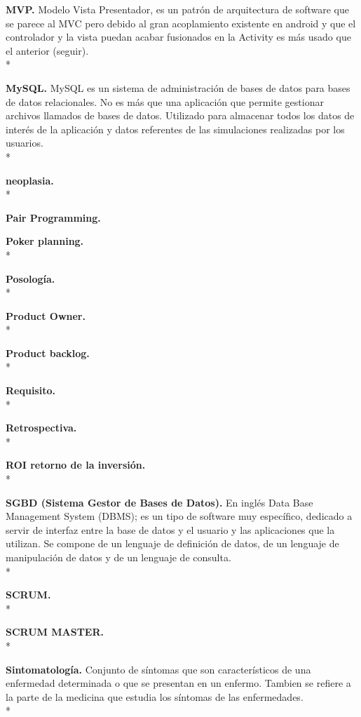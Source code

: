 \documentclass[../pfc.tex]{subfiles}
\begin{document}
	\textbf{MVP.}
	Modelo Vista Presentador, es un patrón de arquitectura de software que se parece al MVC pero debido al gran acoplamiento existente en android y que el controlador y la vista puedan acabar fusionados en la Activity es más usado que el anterior (seguir).\\*
	
	\textbf{MySQL.}
	MySQL es un sistema de administración de bases de datos para bases de datos relacionales. No es más que una aplicación que permite gestionar archivos llamados de bases de datos. Utilizado para almacenar todos los datos de interés de la aplicación y datos referentes de las simulaciones realizadas por los usuarios.\\*
	
	\textbf{neoplasia.}\\*
	
	\textbf{Pair Programming.}
	
	\textbf{Poker planning.}\\*
	
	\textbf{Posología.}\\*
	
	\textbf{Product Owner.}\\*
	
	\textbf{Product backlog.}\\*
	
	\textbf{Requisito.}\\*	
	
	\textbf{Retrospectiva.}\\*	
	
	\textbf{ROI retorno de la inversión.}\\*	
	
	\textbf{SGBD (Sistema Gestor de Bases de Datos).}
	En inglés Data Base Management System (DBMS); es un tipo de software muy específico, dedicado a servir de interfaz entre la base de datos y el usuario y las aplicaciones que la utilizan. Se compone de un lenguaje de definición de datos, de un lenguaje de manipulación de datos y de un lenguaje de consulta.\\*
	
	\textbf{SCRUM.}\\*
	
	\textbf{SCRUM MASTER.}\\*	
	
	\textbf{Sintomatología.}
	Conjunto de síntomas que son característicos de una enfermedad determinada o que se presentan en un enfermo.
	Tambien se refiere a la parte de la medicina que estudia los síntomas de las enfermedades.\\*
	
\end{document}
